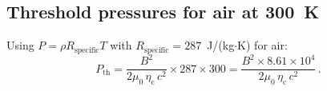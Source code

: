 \documentclass[12pt,a4paper]{article}
\newcommand{\etac}{\eta_{\mathrm{c}}}
\begin{document}
\subsection{Threshold pressures for air at 300~K}

Using $P = \rho R_{\text{specific}} T$ with $R_{\text{specific}} = 287$~J/(kg$\cdot$K) for air:
\begin{equation}
P_{\text{th}} = \frac{B^2}{2\mu_0\,\etac\, c^2} \times 287 \times 300 = \frac{B^2 \times 8.61 \times 10^4}{2\mu_0\,\etac\, c^2}\,.
\end{equation}
\end{document}
